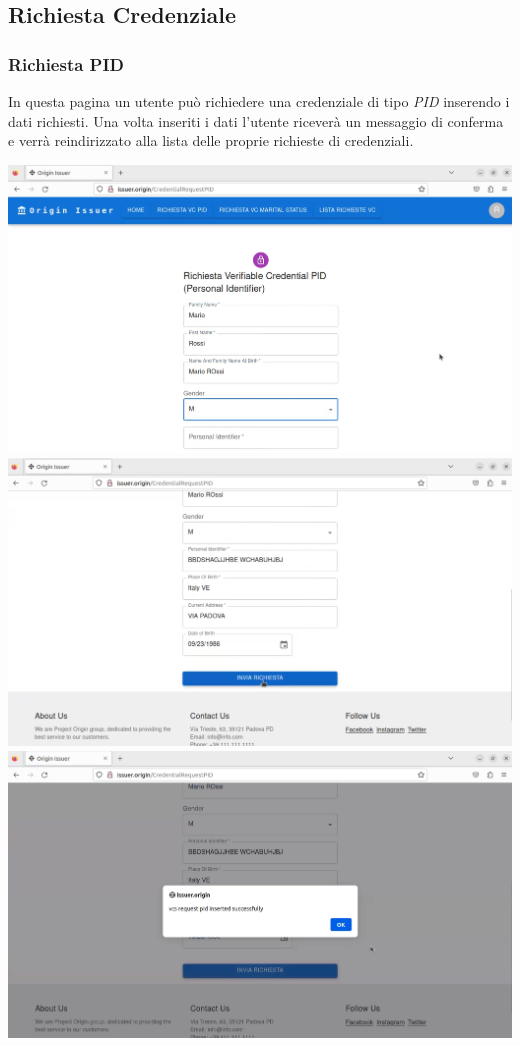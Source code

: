 \subsection{Richiesta Credenziale}
\subsubsection{Richiesta PID}
In questa pagina un utente può richiedere una credenziale di tipo \textit{PID} inserendo i dati richiesti. Una volta inseriti i dati l'utente riceverà un messaggio di conferma e verrà reindirizzato alla lista delle proprie richieste di credenziali.
\begin{center}
\includegraphics[scale = 0.2]{./res/img/issuer/new/richiestapid1.png}
\includegraphics[scale = 0.2]{./res/img/issuer/new/richiestapid2.png}
\includegraphics[scale = 0.2]{./res/img/issuer/new/richiestapid3.png}
\end{center}

